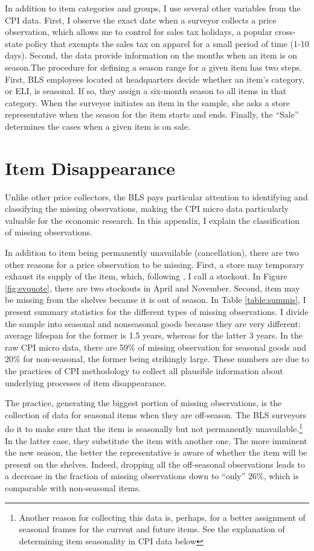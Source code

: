 \documentclass[12pt]{article}
\begin{document}
		In addition to item categories and groups, I use several other variables from the CPI data. First, I observe the exact date when a surveyor collects a price observation, which allows me to control for sales tax holidays, a popular cross-state policy that exempts the sales tax on apparel for a small period of time (1-10 days). Second, the data provide information on the months when an item is on season.The procedure for defining a season range for a given item has two steps. First, BLS employees located at headquarters decide whether an item's category, or ELI, is seasonal. If so, they assign a six-month season to all items in that category. When the surveyor initiates an item in the sample, she asks a store representative when the season for the item starts and ends. Finally, the ``Sale'' determines the cases when a given item is on sale.
		

\section{Item Disappearance}		
	\label{sec:id}
	Unlike other price collectors, the BLS pays particular attention to identifying and classifying the missing observations, making the CPI micro data particularly valuable for the economic research. In this appendix, I explain the classification of missing observations.
	
	In addition to item being permanently unavailable (cancellation), there are two other reasons for a price observation to be missing. First, a store may temporary exhaust its supply of the item, which, following \citet{matsa}, I call a stockout. In Figure \ref{fig:evquote}, there are two stockouts in April and November. Second, item may be missing from the shelves because it is out of season. In Table \ref{table:summis}, I present summary statistics for the different types of missing observations. I divide the sample into seasonal and nonseasonal goods because they are very different: average lifespan for the former is 1.5 years, whereas for the latter 3 years. In the raw CPI micro data, there are 59\% of missing observation for seasonal goods and 20\% for non-seasonal, the former being strikingly large. These numbers are due to the practices of CPI methodology to collect all plausible information about underlying processes of item disappearance.
	
	The practice, generating the biggest portion of missing observations, is the collection of data for seasonal items when they are off-season. The BLS surveyors do it to make sure that the item is seasonally but not permanently unavailable.\footnote{Another reason for collecting this data is, perhaps, for a better assignment of seasonal frames for the current and future items. See the explanation of determining item seasonality in CPI data below} In the latter case, they substitute the item with another one. The more imminent the new season, the better the representative is aware of whether the item will be present on the shelves. Indeed, dropping all the off-seasonal observations leads to a decrease in the fraction of missing observations down to ``only'' 26\%, which is comparable with non-seasonal items.
	
\end{document}
